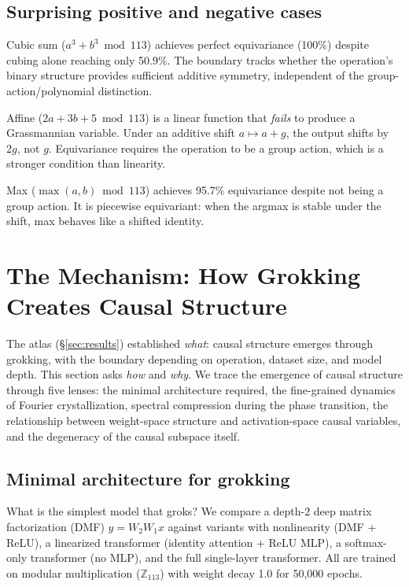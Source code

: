 \documentclass{article}
\newcommand{\Z}{\mathbb{Z}}
\begin{document}
\subsection{Surprising positive and negative cases}

Cubic sum ($a^3 + b^3 \bmod 113$) achieves perfect equivariance (100\%) despite
cubing alone reaching only 50.9\%. The boundary tracks whether the operation's binary structure provides sufficient
additive symmetry, independent of the group-action/polynomial distinction.

Affine ($2a + 3b + 5 \bmod 113$) is a linear function that \emph{fails} to
produce a Grassmannian variable. Under an additive shift $a \mapsto a + g$, the
output shifts by $2g$, not $g$. Equivariance requires the operation to be a group
action, which is a stronger condition than linearity.

Max ($\max(a,b) \bmod 113$) achieves 95.7\% equivariance despite not being a
group action. It is piecewise equivariant: when the argmax is stable under the
shift, max behaves like a shifted identity.


\section{The Mechanism: How Grokking Creates Causal Structure}
\label{sec:mechanism}

The atlas (\S\ref{sec:results}) established \emph{what}: causal structure
emerges through grokking, with the boundary depending on operation, dataset
size, and model depth. This section asks \emph{how} and \emph{why}.
We trace the emergence of causal structure through five lenses: the minimal
architecture required, the fine-grained dynamics of Fourier crystallization,
spectral compression during the phase transition, the relationship between
weight-space structure and activation-space causal variables, and the
degeneracy of the causal subspace itself.

\subsection{Minimal architecture for grokking}
\label{sec:dmf}

What is the simplest model that groks? We compare a depth-2 deep matrix
factorization (DMF) $y = W_2 W_1 x$ against variants with nonlinearity
(DMF + ReLU), a linearized transformer (identity attention + ReLU MLP),
a softmax-only transformer (no MLP), and the full single-layer transformer.
All are trained on modular multiplication ($\Z_{113}$) with weight decay 1.0
for 50{,}000 epochs.
\end{document}
